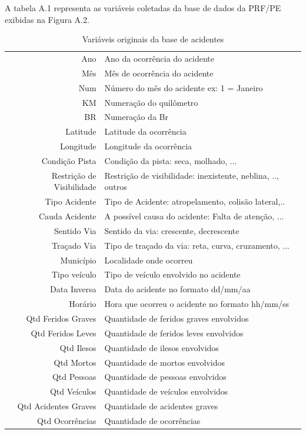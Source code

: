 

A tabela A.1 representa as variáveis coletadas da base de dados da PRF/PE exibidas na Figura A.2.

\begin{table}[htbp!]
 \centering
  \caption{Variáveis originais da base de acidentes} 
  \begin{tabular}{r|l} \hline
   Ano & Ano da ocorrência do acidente\\
   Mês & Mês de ocorrência do acidente\\
   Num & Número do mês do acidente ex: 1 = Janeiro \\
   KM & Numeração do quilômetro \\
   BR & Numeração da Br\\
   Latitude & Latitude da ocorrência \\
   Longitude & Longitude da ocorrência \\
   Condição Pista & Condição da pista: seca, molhado, ... \\
   Restrição de Visibilidade & Restrição de visibilidade: inexistente, neblina, .., outros \\
   Tipo Acidente & Tipo de Acidente: atropelamento, colisão lateral,..\\
   Cauda Acidente & A possível causa do acidente: Falta de atenção, ... \\
   Sentido Via & Sentido da via: crescente, decrescente \\
   Traçado Via & Tipo de traçado da via: reta, curva, cruzamento, ... \\
   Município  & Localidade onde ocorreu \\
   Tipo veículo & Tipo de veículo envolvido no acidente \\
   Data Inversa & Data do acidente no formato dd/mm/aa \\
   Horário & Hora que ocorreu o acidente no formato hh/mm/ss \\
   Qtd Feridos Graves & Quantidade de feridos graves envolvidos \\
   Qtd Feridos Leves & Quantidade de feridos leves envolvidos\\
   Qtd Ilesos & Quantidade de ilesos envolvidos\\
   Qtd Mortos & Quantidade de mortos envolvidos \\
   Qtd Pessoas & Quantidade de pessoas envolvidos \\
   Qtd Veículos & Quantidade de veículos envolvidos\\
   Qtd Acidentes Graves & Quantidade de acidentes graves \\
   Qtd Ocorrências & Quantidade de ocorrências \\
  \end{tabular}
\end{table}


